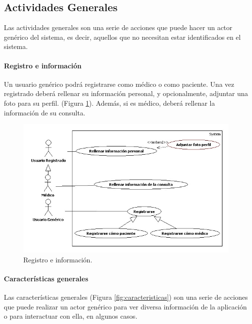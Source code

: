 \documentclass[a4paper,oneside,11pt]{book}
\begin{document}
			
	
		\subsection{Actividades Generales} %
		\label{sec:actividades_generales}
		
			Las actividades generales son una serie de acciones que puede hacer un actor genérico del sistema, es decir, aquellos que no necesitan estar identificados en el sistema.
			\paragraph{Registro e información} %
			\label{par:registro_e_informacion}
				Un usuario genérico podrá registrarse como médico o como paciente. Una vez registrado deberá rellenar su información personal, y opcionalmente, adjuntar una foto para su perfil. (Figura \ref{fig:reg_inf}). Además, si es médico, deberá rellenar la información de su consulta.
				\begin{figure}[H]
				  \centering
				    \includegraphics[width=14cm]{img/jpg/casos_uso/Registro_e_informacion.jpg}
				  \caption{Registro e información.}
				  \label{fig:reg_inf}
				\end{figure}
			
			\paragraph{Características generales} %
			\label{par:caracteristicas_generales}
				Las características generales (Figura \ref{fig:caracteristicas}) son una serie de acciones que puede realizar un actor genérico para ver diversa información de la aplicación o para interactuar con ella, en algunos casos.
							
\end{document}
